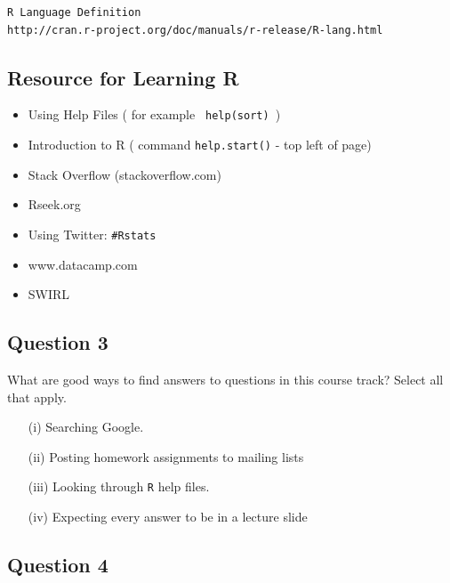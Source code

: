 \documentclass[12pt]{article}
\begin{document}
\begin{verbatim}
R Language Definition
http://cran.r-project.org/doc/manuals/r-release/R-lang.html
\end{verbatim}
\newpage
\subsection*{Resource for Learning R}


\begin{itemize}
\item  Using Help Files ( for example \texttt{ help(sort) })
\item Introduction to R ( command \texttt{help.start()} - top left of page)
\item Stack Overflow (stackoverflow.com)
\item Rseek.org
\item Using Twitter: \texttt{\#Rstats}
\item www.datacamp.com
\item SWIRL
\end{itemize}

\newpage
\subsection*{Question 3}
 
What are good ways to find answers to questions in this course track? Select all that apply. 

\begin{itemize}

\item[(i)] Searching Google. 

\item[(ii)]  Posting homework assignments to mailing lists 

\item[(iii)] Looking through \texttt{R} help files. 

\item[(iv)] Expecting every answer to be in a lecture slide 
\end{itemize}

\newpage
\subsection*{Question 4}
\end{document}
